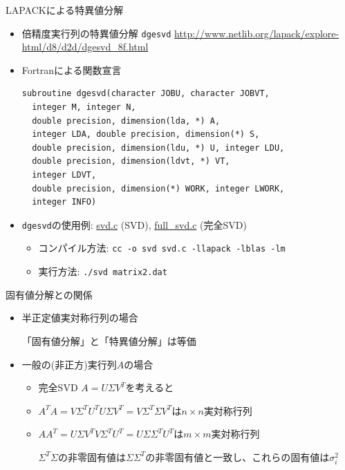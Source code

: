 \begin{frame}[t,fragile]{LAPACKによる特異値分解}
  \begin{itemize}
  \item 倍精度実行列の特異値分解 {\tt dgesvd}
    \url{http://www.netlib.org/lapack/explore-html/d8/d2d/dgesvd_8f.html}
  \item Fortranによる関数宣言
\begin{lstlisting}
subroutine dgesvd(character JOBU, character JOBVT,
  integer M, integer N,
  double precision, dimension(lda, *) A,
  integer LDA, double precision, dimension(*) S,
  double precision, dimension(ldu, *) U, integer LDU,
  double precision, dimension(ldvt, *) VT,
  integer LDVT,
  double precision, dimension(*) WORK, integer LWORK,
  integer INFO)
\end{lstlisting}
  \item {\tt dgesvd}の使用例: \href{https://github.com/todo-group/computer-experiments/blob/master/exercise/svd/svd.c}{svd.c} (SVD), \href{https://github.com/todo-group/computer-experiments/blob/master/exercise/svd/full_svd.c}{full\_svd.c} (完全SVD)
    \begin{itemize}
    \item コンパイル方法: {\tt cc -o svd svd.c -llapack -lblas -lm}
    \item 実行方法: {\tt ./svd matrix2.dat}
    \end{itemize}
  \end{itemize}
\end{frame}

\begin{frame}[t,fragile]{固有値分解との関係}
  \begin{itemize}
  \item 半正定値実対称行列の場合

    「固有値分解」と「特異値分解」は等価
  \item 一般の(非正方)実行列$A$の場合
    \begin{itemize}
    \item 完全SVD  $A=U \Sigma V^T$を考えると
    \item $A^T A = V \Sigma^T U^T U \Sigma V^T = V \Sigma^T \Sigma V^T$は\(n \times n\)実対称行列

    \item $A A^T = U \Sigma V^T V \Sigma^T U^T = U \Sigma \Sigma^T U^T$は\(m \times m\)実対称行列

      $\Sigma^T \Sigma$の非零固有値は$\Sigma \Sigma^T$の非零固有値と一致し、これらの固有値は$\sigma_i^2$
    \end{itemize}
  \end{itemize}
\end{frame}

